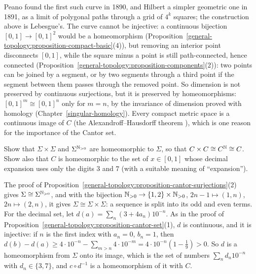 Peano found the first such curve in 1890, and Hilbert a simpler geometric one in 1891, as a limit of polygonal paths through a grid of $4^k$ squares; the construction above is Lebesgue's. The curve
cannot be injective: a continuous bijection $[0, 1] \to [0, 1]^2$ would be a homeomorphism (Proposition~\ref{general-topology:proposition-compact-basic}(4)), but removing an interior point disconnects
$[0, 1]$, while the square minus a point is still path-connected, hence connected (Proposition~\ref{general-topology:proposition-components}(2)): two points can be joined by a segment, or by two segments
through a third point if the segment between them passes through the removed point. So dimension is not preserved by continuous surjections, but it is preserved by homeomorphisms: $[0, 1]^m \cong [0, 1]^n$
only for $m = n$, by the invariance of dimension proved with homology (Chapter~\ref{singular-homology}). Every compact metric space is a continuous image of $C$ (the Alexandroff--Hausdorff theorem \cite{kechris-1995}),
which is one reason for the importance of the Cantor set.

\begin{exercise}\label{general-topology:exercise-cantor-products}
Show that $\Sigma \times \Sigma$ and $\Sigma^{\mathbb{N}_{>0}}$ are homeomorphic to $\Sigma$, so that $C \times C \cong C^{\mathbb{N}} \cong C$. Show also that $C$ is homeomorphic to the set of $x \in [0, 1]$ whose decimal
expansion uses only the digits $3$ and $7$ (with a suitable meaning of ``expansion'').
\end{exercise}

\begin{solution}
The proof of Proposition~\ref{general-topology:proposition-cantor-surjections}(2) gives $\Sigma \cong \Sigma^{\mathbb{N}_{>0}}$, and with the bijection $\mathbb{N}_{>0} \to \{1, 2\} \times \mathbb{N}_{>0}$, $2n - 1 \mapsto (1, n)$, $2n \mapsto (2, n)$,
it gives $\Sigma \cong \Sigma \times \Sigma$: a sequence is split into its odd and even terms. For the decimal set, let $d(a) = \sum_n(3 + 4a_n)10^{-n}$. As in the proof of
Proposition~\ref{general-topology:proposition-cantor-set}(1), $d$ is continuous, and it is injective: if $n$ is the first index with $a_n = 0$, $b_n = 1$, then
$d(b) - d(a) \geq 4 \cdot 10^{-n} - \sum_{m > n}4 \cdot 10^{-m} = 4 \cdot 10^{-n}(1 - \frac19) > 0$. So $d$ is a homeomorphism from $\Sigma$ onto its image, which is the set of numbers $\sum_nd_n10^{-n}$ with
$d_n \in \{3, 7\}$, and $c \circ d^{-1}$ is a homeomorphism of it with $C$.
\end{solution}

